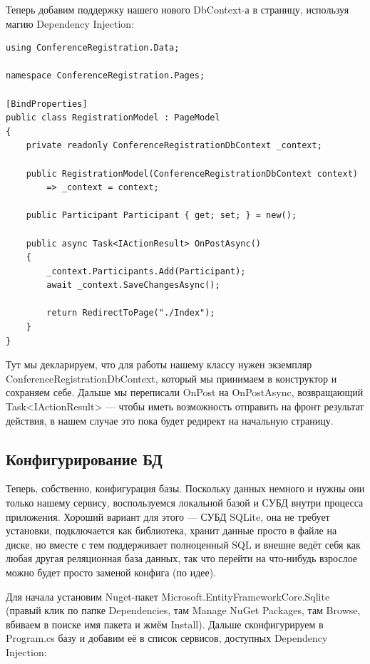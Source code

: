 \documentclass[a5paper]{article}
\begin{document}
Теперь добавим поддержку нашего нового DbContext-а в страницу, используя магию Dependency Injection:

\begin{verbatim}
using ConferenceRegistration.Data;

namespace ConferenceRegistration.Pages;

[BindProperties]
public class RegistrationModel : PageModel
{
    private readonly ConferenceRegistrationDbContext _context;

    public RegistrationModel(ConferenceRegistrationDbContext context)
        => _context = context;

    public Participant Participant { get; set; } = new();

    public async Task<IActionResult> OnPostAsync()
    {
        _context.Participants.Add(Participant);
        await _context.SaveChangesAsync();

        return RedirectToPage("./Index");
    }
}
\end{verbatim}

Тут мы декларируем, что для работы нашему классу нужен экземпляр ConferenceRegistrationDbContext, который мы принимаем в конструктор и сохраняем себе. Дальше мы переписали OnPost на OnPostAsync, возвращающий Task<IActionResult> --- чтобы иметь возможность отправить на фронт результат действия, в нашем случае это пока будет редирект на начальную страницу.

\subsection{Конфигурирование БД}

Теперь, собственно, конфигурация базы. Поскольку данных немного и нужны они только нашему сервису, воспользуемся локальной базой и СУБД внутри процесса приложения. Хороший вариант для этого --- СУБД SQLite, она не требует установки, подключается как библиотека, хранит данные просто в файле на диске, но вместе с тем поддерживает полноценный SQL и внешне ведёт себя как любая другая реляционная база данных, так что перейти на что-нибудь взрослое можно будет просто заменой конфига (по идее).

Для начала установим Nuget-пакет Microsoft.EntityFrameworkCore.Sqlite (правый клик по папке Dependencies, там Manage NuGet Packages, там Browse, вбиваем в поиске имя пакета и жмём Install). Дальше сконфигурируем в Program.cs базу и добавим её в список сервисов, доступных Dependency Injection:
\end{document}
